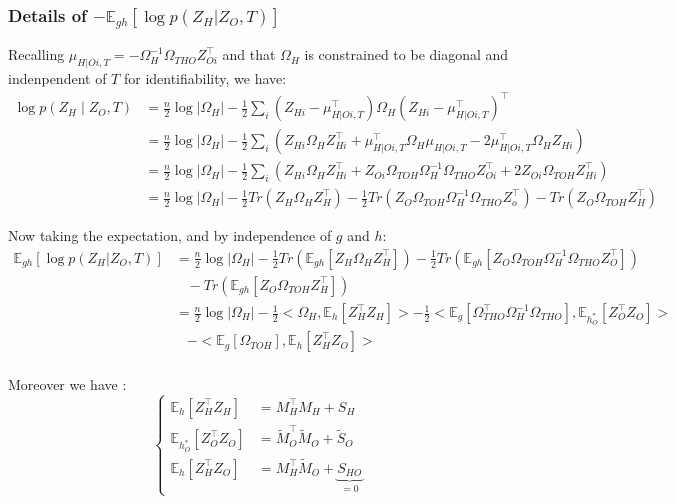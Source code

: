 \documentclass[11pt,a4paper]{article}
\newcommand{\Esp}{\mathds{E}}
\begin{document}
\subsubsection{Details of  $-\Esp_{gh}[\log p(Z_H | Z_O,T) ]$}
Recalling $\mu_{H|Oi,T} = -\Omega_H^{-1}\Omega_{THO}Z_{Oi} ^\intercal $ and that $\Omega_H$ is constrained to be diagonal and indenpendent of $T$ for identifiability, we have:
\begin{align*}
\log p(Z_H\mid Z_O,T) &= \frac{n}{2} \log |\Omega_H| -\frac{1}{2} \sum_i (Z_{Hi}-\mu_{H|Oi,T}^\intercal )\Omega_H(Z_{Hi}-\mu_{H|Oi,T}^\intercal )^\intercal \\
&= \frac{n}{2} \log |\Omega_H| -\frac{1}{2} \sum_i \left(Z_{Hi}\Omega_HZ_{Hi}^\intercal  + \mu_{H|Oi,T}^\intercal \Omega_H\mu_{H|Oi,T} - 2\mu_{H|Oi,T}^\intercal \Omega_HZ_{Hi} \right)\\
&= \frac{n}{2} \log |\Omega_H| -\frac{1}{2} \sum_i \left(Z_{Hi}\Omega_HZ_{Hi}^\intercal  + Z_{Oi}\Omega_{TOH}\Omega_H^{-1} \Omega_{THO}Z_{Oi}^\intercal + 2Z_{Oi}\Omega_{TOH}Z_{Hi}^\intercal\right)\\
&=\frac{n}{2} \log |\Omega_H| -\frac{1}{2}Tr(Z_H\Omega_HZ_H^\intercal) - \frac{1}{2}Tr(Z_O\Omega_{TOH}\Omega_H^{-1}\Omega_{THO}Z_o^\intercal) - Tr(Z_O\Omega_{TOH}Z_H^\intercal)
\end{align*}


Now taking the expectation, and by independence of $g$ and $h$:
\begin{align*}
\Esp_{gh}[\log p(Z_H | Z_O,T) ] &=\frac{n}{2} \log |\Omega_H| -\frac{1}{2}Tr(\Esp_{gh}[Z_H\Omega_HZ_H^\intercal]) - \frac{1}{2}Tr(\Esp_{gh}[Z_O\Omega_{TOH}\Omega_H^{-1}\Omega_{THO}Z_O^\intercal]) \\
& \;\;\;- Tr(\Esp_{gh}[Z_O\Omega_{TOH}Z_H^\intercal])\\
&=\frac{n}{2} \log |\Omega_H| -\frac{1}{2} <\Omega_H,\Esp_h[Z_H^\intercal Z_H]> -\frac{1}{2} <\Esp_g[\Omega_{THO}^\intercal \Omega_H^{-1}\Omega_{THO}],\Esp_{h_O^*}[Z_O^\intercal Z_O]> \\
&\;\;\; -<\Esp_g[\Omega_{TOH}],\Esp_h[Z_H^\intercal Z_O]>
\end{align*}\\

Moreover we have :
\[\left\{\begin{array}{ll}
\Esp_h[Z_H^\intercal Z_H] &= M_H^\intercal M_H + S_H\\
\Esp_{h_O^*}[Z_O^\intercal Z_O] &= \widetilde{M}_O^\intercal \widetilde{M}_ O + \widetilde{S}_ O\\
\Esp_h[Z_H^\intercal Z_O] &= M_H^\intercal \widetilde{M}_O + \underbrace{S_{HO}}_{=0}
\end{array} \right.\]
\end{document}
